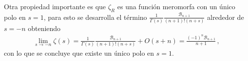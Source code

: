 Otra propiedad importante es que $ \zeta _{R}$ es una función meromorfa con un único polo en $s = 1$, para esto se desarrolla el término $\frac{1}{\Gamma (s)} \frac{ \mathcal{B} _{n+1}}{ (n+1)! (n + s)}$ alrededor de $s = -n$ obteniendo
\begin{align}
	\lim _{s \rightarrow -n }	
	\zeta ( s  ) = 
	\frac{1}{\Gamma (s)}
	\frac{ \mathcal{B} _{n+1}}{ (n+1)! (n + s)}
	+ O (s + n) = 
	\frac{(-1) ^n \mathcal{B} _{n+1}}
		{n+1}
	\, ,
\end{align}
con lo que se concluye que existe un único polo en $s = 1$.













